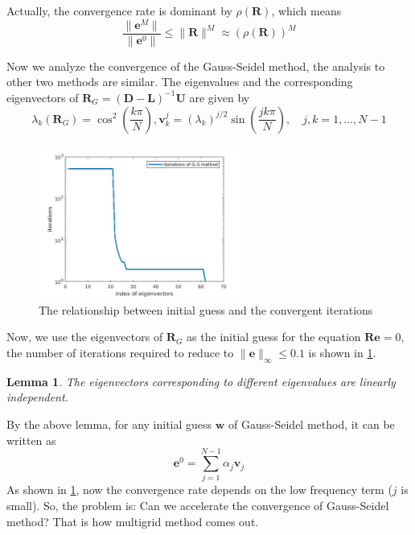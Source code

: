 \documentclass[onecolumn, conference]{IEEEtran}
\newtheorem{lemma}{Lemma}
\begin{document}
Actually, the convergence rate is dominant by $\rho(\mathbf{R})$, which means
\begin{equation}
    \frac{\|\mathbf{e}^M\|}{\|\mathbf{e}^0\|}\leq \|\mathbf{R}\|^M\approx \left(\rho(\mathbf{R})\right)^M
\end{equation}

Now we analyze the convergence of the Gauss-Seidel method, the analysis to other two methods are similar. The eigenvalues and the corresponding eigenvectors of $\mathbf{R}_G=\left(\mathbf{D}-\mathbf{L}\right)^{-1}\mathbf{U}$ are given by
\begin{equation}
    \lambda_k(\mathbf{R}_G)=\cos^2\left(\frac{k\pi}{N}\right), \mathbf{v}_k^{j}=(\lambda_k)^{j/2}\sin\left(\frac{jk\pi}{N}\right),\quad j,k=1,\dots,N-1
\end{equation}
\begin{figure}[htbp]
    \centering
    \includegraphics[width=0.6\textwidth]{G_S_iterations.jpg}
    \caption{The relationship between initial guess and the convergent iterations}
    \label{fig:G_S_iterations}
\end{figure}
Now, we use the eigenvectors of $\mathbf{R}_G$ as the initial guess for the equation $\mathbf{R}\mathbf{e}=0$, the number of iterations required to reduce to $\|\mathbf{e}\|_\infty\leq 0.1$ is shown in \ref{fig:G_S_iterations}. 
\begin{lemma}
    The eigenvectors corresponding to different eigenvalues are linearly independent.
\end{lemma} 
By the above lemma, for any initial guess $\mathbf{w}$ of Gauss-Seidel method, it can be written as 
\begin{equation}
    \mathbf{e}^0=\sum_{j=1}^{N-1}\alpha_j\mathbf{v}_j
\end{equation}
As shown in \ref{fig:G_S_iterations}, now the convergence rate depends on the low frequency term ($j$ is small). So, the problem is: Can we accelerate the convergence of Gauss-Seidel method? That is how multigrid method comes out.
\end{document}
